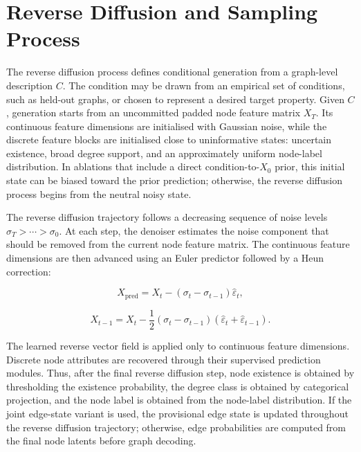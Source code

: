\section{Reverse Diffusion and Sampling Process}
\label{sec:generator:sampling}

The reverse diffusion process defines conditional generation from a graph-level
description \(C\). The condition may be drawn from an empirical set of
conditions, such as held-out graphs, or chosen to represent a desired
target property. Given \(C\), generation starts from an uncommitted padded node
feature matrix \(X_T\). Its continuous feature dimensions are initialised with
Gaussian noise, while the discrete feature blocks are initialised close to
uninformative states: uncertain existence, broad degree support, and an
approximately uniform node-label distribution. In ablations that include a
direct condition-to-\(X_0\) prior, this initial state can be biased toward the
prior prediction; otherwise, the reverse diffusion process begins from the
neutral noisy state.

The reverse diffusion trajectory follows a decreasing sequence of noise levels
\(\sigma_T > \cdots > \sigma_0\). At each step, the denoiser estimates the
noise component that should be removed from the current node feature matrix.
The continuous feature dimensions are then advanced using an Euler predictor
followed by a Heun correction:

\[
    X_{\mathrm{pred}}
    =
    X_t - (\sigma_t-\sigma_{t-1})\hat{\varepsilon}_t,
\]

\[
    X_{t-1}
    =
    X_t
    -
    \frac{1}{2}(\sigma_t-\sigma_{t-1})
    (\hat{\varepsilon}_t+\hat{\varepsilon}_{t-1}).
\]

The learned reverse vector field is applied only to continuous feature dimensions.
Discrete node attributes are recovered through their supervised prediction
modules. Thus, after the final reverse diffusion step, node existence is obtained by
thresholding the existence probability, the degree class is obtained by
categorical projection, and the node label is obtained from the node-label
distribution. If the joint edge-state variant is used, the provisional edge
state is updated throughout the reverse diffusion trajectory; otherwise, edge
probabilities are computed from the final node latents before graph decoding.

